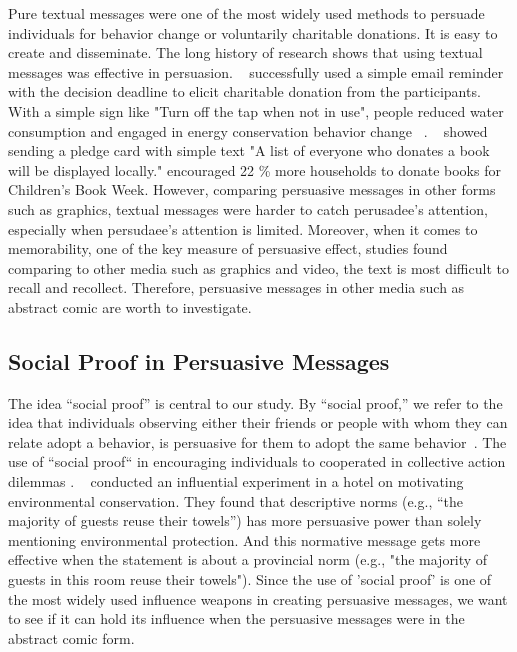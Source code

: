 Pure textual messages were one of the most widely used methods to persuade individuals for behavior change or voluntarily charitable donations. It is easy to create and disseminate. The long history of research shows that using textual messages was effective in persuasion. ~\textcite{damgaard2017now} successfully used a simple email reminder with the decision deadline to elicit charitable donation from the participants. With a simple sign like "Turn off the tap when not in use", people reduced water consumption and engaged in energy conservation behavior change ~\cite{mckenzie2011fostering}. ~\textcite{cotterill2010impact} showed sending a pledge card with simple text "A list of everyone who donates a book will be displayed locally." encouraged 22 \% more households to donate books for Children's Book Week. However, comparing persuasive messages in other forms such as graphics, textual messages were harder to catch perusadee's attention, especially when persudaee's attention is limited. Moreover, when it comes to memorability, one of the key measure of persuasive effect, studies found comparing to other media such as graphics and video, the text is most difficult to recall and recollect. Therefore, persuasive messages in other media such as abstract comic are worth to investigate. 


\subsection{Social Proof in Persuasive Messages }
The idea ``social proof'' is central to our study. By ``social proof,'' we refer to the idea that individuals observing either their friends or people with whom they can relate adopt a behavior, is persuasive for them to adopt the same behavior~\cite{Cialdini1993, Cialdini2004}. The use of ``social proof`` in encouraging individuals to cooperated in collective action dilemmas \cite{goldstein2008room,schultz2007constructive}. ~\textcite{goldstein2008room} conducted an influential experiment in a hotel on motivating environmental conservation. They found that descriptive norms (e.g., ``the majority of guests reuse their towels'') has more persuasive power than solely mentioning environmental protection. And this normative message gets more effective when the statement is about a provincial norm (e.g., "the majority of guests in this room reuse their towels"). Since the use of 'social proof' is one of the most widely used influence weapons in creating persuasive messages, we want to see if it can hold its influence when the persuasive messages were in the abstract comic form. 


